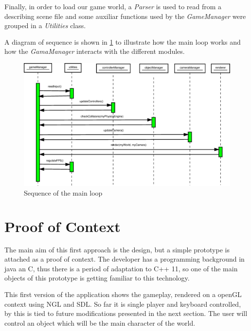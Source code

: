 \documentclass[]{article}
\begin{document}
Finally, in order to load our game world, a \emph{Parser} is used to read from a describing scene file and some auxiliar functions used by the \emph{GameManager} were grouped in a \emph{Utilities} class.

A diagram of sequence is shown in \ref{fig:mainLoop} to illustrate how the main loop works and how the \emph{GamaManager} interacts with the different modules.

\begin{figure}[h]
\begin{center}
\includegraphics[width=1\textwidth]{images/mainLoopSequence.eps}
\caption{Sequence of the main loop}
\label{fig:mainLoop}
\end{center}
\end{figure}


\section{Proof of Context}

The main aim of this first approach is the design, but a simple prototype is attached as a proof of context. The developer has a programming background in java an C, thus there is a period of adaptation to C++ 11, so one of the main objects of this prototype is getting familiar to this technology.

This first version of the application shows the gameplay, rendered on a openGL context using NGL and SDL. So far it is single player and keyboard controlled, by this is tied to future modifications presented in the next section. The user will control an object which will be the main character of the world.
\end{document}
